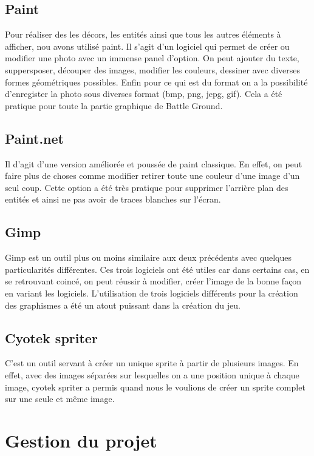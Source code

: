 \documentclass[a4paper,11pt]{article}
\begin{document}
\subsection{Paint}
Pour réaliser des les décors, les entités ainsi que tous les autres éléments à afficher,
nou avons utilisé paint. Il s'agit d'un logiciel qui permet de créer ou modifier une photo avec un immense panel d'option. On peut ajouter du texte,
suppersposer, découper des images, modifier les couleurs, dessiner avec diverses formes géométriques possibles. Enfin pour ce qui est du format on a la possibilité d'enregister la photo sous diverses format (bmp, png, jepg, gif). Cela a été pratique
pour toute la partie graphique de Battle Ground.\\
\subsection{Paint.net}
Il d'agit d'une version améliorée et poussée de paint classique. En effet, on peut faire plus de choses comme modifier retirer toute une couleur
d'une image d'un seul coup. Cette option a été très pratique pour supprimer l'arrière plan des entités et ainsi ne pas avoir de traces blanches sur l'écran.\\
\subsection{Gimp}
Gimp est un outil plus ou moins similaire aux deux précédents avec quelques particularités différentes. Ces trois logiciels ont été utiles car dans certains cas, en se retrouvant coincé,
on peut réussir à modifier, créer l'image de la bonne façon en variant les logiciels. L'utilisation de trois logiciels différents pour la création des graphismes a été un atout puissant dans la création du jeu.\\
\subsection{Cyotek spriter}
C'est un outil servant à créer un unique sprite à partir de plusieurs images. En effet, avec des images séparées sur lesquelles on a une position
unique à chaque image, cyotek spriter a permis quand nous le voulions de créer un sprite complet sur une seule et même image.\\ 

\section{Gestion du projet}
\end{document}
